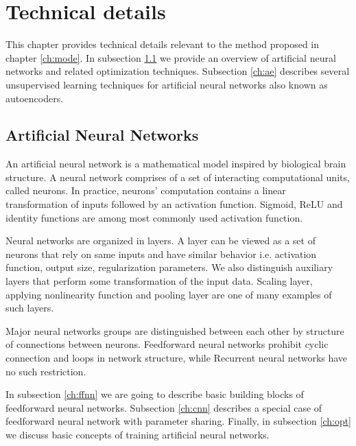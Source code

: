 
\chapter{Technical details}
\label{ch:tede}

This chapter provides technical details relevant to the method proposed in chapter \ref{ch:mode}.
In subsection \ref{ch:nn} we provide an overview of artificial neural networks and related optimization techniques.
Subsection \ref{ch:ae} describes several unsupervised learning techniques for artificial neural networks also known as autoencoders.

\section{Artificial Neural Networks}
\label{ch:nn}
An artificial neural network is a mathematical model inspired by biological brain structure.
A neural network comprises of a set of interacting computational units, called neurons.
In practice, neurons' computation contains a linear transformation of inputs followed by an activation function.
Sigmoid, ReLU and identity functions are among most commonly used activation function.

Neural networks are organized in layers.
A layer can be viewed as a set of neurons that rely on same inputs and have similar behavior i.e. activation function, output size, regularization parameters.
We also distinguish auxiliary layers that perform some transformation of the input data.
Scaling layer, applying nonlinearity function and pooling layer are one of many examples of such layers.

Major neural networks groups are distinguished between each other by structure of connections between neurons.
Feedforward neural networks prohibit cyclic connection and loops in network structure, while Recurrent neural networks have no such restriction.

In subsection \ref{ch:ffnn} we are going to describe basic building blocks of feedforward neural networks.
Subsection \ref{ch:cnn} describes a special case of feedforward neural network with parameter sharing.
Finally, in subsection \ref{ch:opt} we discuss basic concepts of training artificial neural networks.

